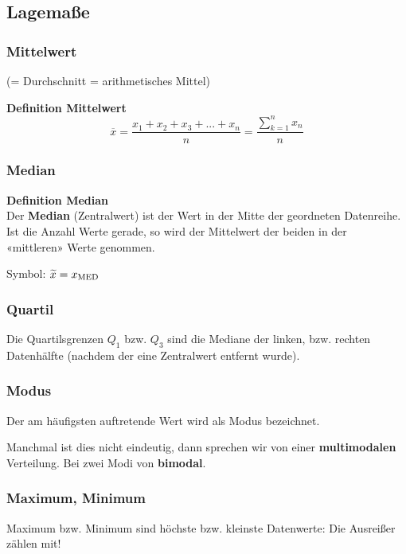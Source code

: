 \hrulefill
\begin{multicols}{2}

\subsection*{Lagemaße}
\subsubsection*{Mittelwert}
(= Durchschnitt = arithmetisches Mittel)

\begin{tcolorbox}[colback=white]
  \textbf{Definition Mittelwert}\\
$$\overline{x} = \frac{x_1 + x_2 + x_3 + ... + x_n}{n}=  \frac{\sum\limits_{k=1}^nx_n}n$$
\end{tcolorbox}

\subsubsection*{Median}

\begin{tcolorbox}[colback=white]
\textbf{Definition Median}\\
Der \textbf{Median} (Zentralwert) ist der Wert in der Mitte der geordneten Datenreihe. Ist
die Anzahl Werte gerade, so wird der Mittelwert der beiden in der
«mittleren» Werte genommen.

Symbol: $\widetilde{x} = x_{\textrm{MED}}$
\end{tcolorbox}

\subsubsection*{Quartil}

Die Quartilsgrenzen $Q_1$ bzw. $Q_3$ sind die Mediane der linken,
bzw. rechten Datenhälfte (nachdem der eine Zentralwert entfernt
wurde).

\subsubsection*{Modus}
Der am häufigsten auftretende Wert wird als Modus bezeichnet.

Manchmal ist dies nicht eindeutig, dann sprechen wir von einer
\textbf{multimodalen} Verteilung. Bei zwei Modi von \textbf{bimodal}.

\subsubsection*{Maximum, Minimum}
Maximum bzw. Minimum sind höchste bzw. kleinste Datenwerte: Die Ausreißer
zählen mit!


\end{multicols}

